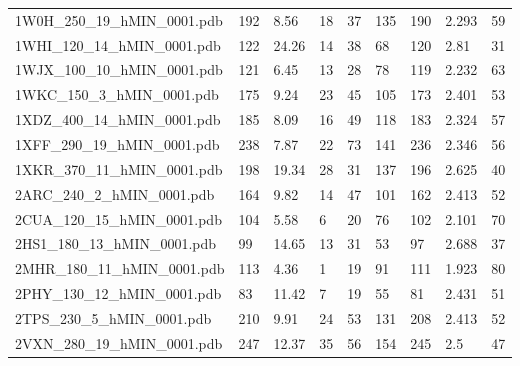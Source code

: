\documentclass{bioinfo}
\begin{document}
\begin{table*}[!t]
{\begin{tabular}{lllllllll}
    1W0H\_250\_19\_hMIN\_0001.pdb & 192      & 8.56       & 18          & 37          & 135         & 190     & 2.293           & 59           \\
    1WHI\_120\_14\_hMIN\_0001.pdb & 122      & 24.26      & 14          & 38          & 68          & 120     & 2.81            & 31           \\
    1WJX\_100\_10\_hMIN\_0001.pdb & 121      & 6.45       & 13          & 28          & 78          & 119     & 2.232           & 63           \\
    1WKC\_150\_3\_hMIN\_0001.pdb & 175      & 9.24       & 23          & 45          & 105         & 173     & 2.401           & 53           \\
    1XDZ\_400\_14\_hMIN\_0001.pdb & 185      & 8.09       & 16          & 49          & 118         & 183     & 2.324           & 57           \\
    1XFF\_290\_19\_hMIN\_0001.pdb & 238      & 7.87       & 22          & 73          & 141         & 236     & 2.346           & 56           \\
    1XKR\_370\_11\_hMIN\_0001.pdb & 198      & 19.34      & 28          & 31          & 137         & 196     & 2.625           & 40           \\
    2ARC\_240\_2\_hMIN\_0001.pdb & 164      & 9.82       & 14          & 47          & 101         & 162     & 2.413           & 52           \\
    2CUA\_120\_15\_hMIN\_0001.pdb & 104      & 5.58       & 6           & 20          & 76          & 102     & 2.101           & 70           \\
    2HS1\_180\_13\_hMIN\_0001.pdb & 99       & 14.65      & 13          & 31          & 53          & 97      & 2.688           & 37           \\
    2MHR\_180\_11\_hMIN\_0001.pdb & 113      & 4.36       & 1           & 19          & 91          & 111     & 1.923           & 80           \\
    2PHY\_130\_12\_hMIN\_0001.pdb & 83       & 11.42      & 7           & 19          & 55          & 81      & 2.431           & 51           \\
    2TPS\_230\_5\_hMIN\_0001.pdb & 210      & 9.91       & 24          & 53          & 131         & 208     & 2.413           & 52           \\
    2VXN\_280\_19\_hMIN\_0001.pdb & 247      & 12.37      & 35          & 56          & 154         & 245     & 2.5             & 47           \\

\end{tabular}}
\end{table*}
\end{document}
